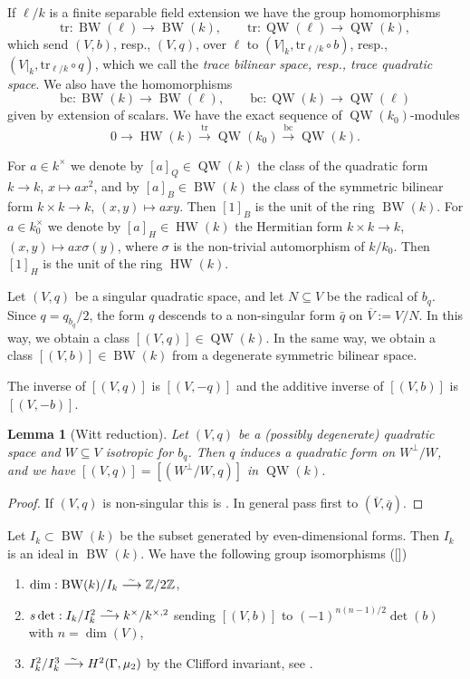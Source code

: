 \documentclass{article}
\def\tx#1{\textrm{#1}}
\def\Z{\mathbb{Z}}
\def\ol#1{\overline{#1}}
\def\simto{\buildrel\hbox{\tiny{$\sim$}}\over\longrightarrow}
\newtheorem{lem}[thm]{Lemma}
\theoremstyle{definition}
\numberwithin{equation}{subsection}
\renewcommand{\-}{\hyp{}}
\DeclareMathOperator{\BW}{BW}
\DeclareMathOperator{\HW}{HW}
\DeclareMathOperator{\QW}{QW}
\begin{document}
\begin{appendices}
If $\ell/k$ is a finite separable field extension we have the group homomorphisms
\[ \tx{tr} : \BW(\ell) \to \BW(k),\qquad \tx{tr} : \QW(\ell) \to \QW(k), \]
which send $(V,b)$, resp., $(V,q)$, over $\ell$ to $(V|_k,\tx{tr}_{\ell/k}\circ b)$, resp., $(V|_k,\tx{tr}_{\ell/k}\circ q)$, which we call the \emph{trace bilinear space, resp., trace quadratic space}. We also have the homomorphisms
\[ \tx{bc} : \BW(k) \to \BW(\ell),\qquad \tx{bc} : \QW(k) \to \QW(\ell) \]
given by extension of scalars. We have the exact sequence of $\QW(k_0)$-modules
\[ 0 \to \HW(k) \xrightarrow{\mathrm{tr}} \QW(k_0) \xrightarrow{\mathrm{bc}} \QW(k). \]

For $a \in k^\times$ we denote by $[a]_Q \in \QW(k)$ the class of the quadratic form $k \to k$, $x \mapsto ax^2$, and by $[a]_B \in \BW(k)$ the class of the symmetric bilinear form $k \times k \to k$, $(x,y) \mapsto axy$. Then $[1]_B$ is the unit of the ring $\BW(k)$. For $a \in k_0^\times$ we denote by $[a]_H \in \HW(k)$ the Hermitian form $k \times k \to k$, $(x,y) \mapsto ax\sigma(y)$, where $\sigma$ is the non-trivial automorphism of $k/k_0$. Then $[1]_H$ is the unit of the ring $\HW(k)$.

Let $(V,q)$ be a singular quadratic space, and let $N \subseteq V$ be the radical of $b_q$. Since $q=q_{b_q}/2$, the form $q$ descends to a non-singular form $\bar q$ on $\ol{V}:=V/N$. In this way, we obtain a class $[(V,q)] \in \QW(k)$. In the same way, we obtain a class $[(V,b)] \in \BW(k)$ from a degenerate symmetric bilinear space.

The inverse of $[(V,q)]$ is $[(V,-q)]$ and the additive inverse of $[(V,b)]$ is $[(V,-b)]$.

\begin{lem}[Witt reduction] \label{lem:wittred}
	Let $(V,q)$ be a (possibly degenerate) quadratic space and $W \subseteq V$ isotropic for $b_q$. Then $q$ induces a quadratic form on $W^\perp/W$, and we have $[(V,q)]=[(W^\perp/W,q)]$ in $\QW(k)$.
\end{lem}
\begin{proof}
	If $(V,q)$ is non-singular this is \cite[Lemma 8.10]{EKM2008}. In general pass first to $(\ol{V},\bar q)$.
\end{proof}

Let $I_k \subset \BW(k)$ be the subset generated by even-dimensional forms. Then $I_k$ is an ideal in $\BW(k)$. We have the following group isomorphisms ([\cite{EKM2008}])
\begin{enumerate}
	\item $\dim : \BW(k)/I_k \simto \Z/2\Z$,
	\item $s\det : I_k/I_k^2 \simto k^\times/k^{\times,2}$ sending $[(V,b)]$ to $(-1)^{n(n-1)/2}\det(b)$ with $n=\dim(V)$, \item $I_k^2/I_k^3 \simto H^2(\Gamma,\mu_2)$ by the Clifford invariant, see \cite[\S14, Fact~16.2, and Chapter~VIII]{EKM2008}.
\end{enumerate}






\end{appendices}
\end{document}
